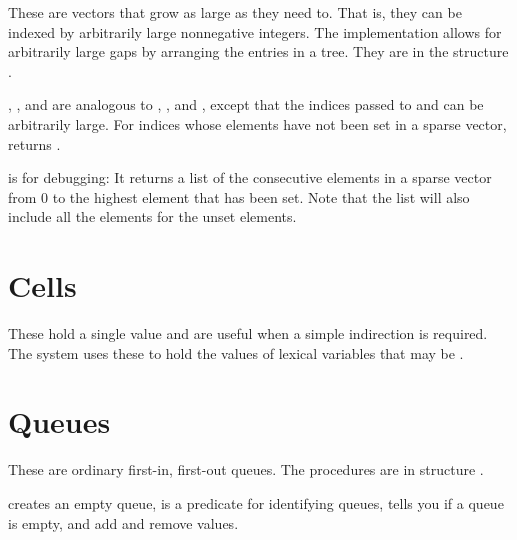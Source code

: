 These are vectors that grow as large as they need to.  That is, they
can be indexed by arbitrarily large nonnegative integers.  The
implementation allows for arbitrarily large gaps by arranging the
entries in a tree.  They are in the structure .

\begin{protos}
\end{protos}
%
, , and
 are analogous to ,
, and , except that the indices
passed to  and  can
be arbitrarily large.  For indices whose elements have not been set in
a sparse vector,  returns .

 is for debugging: It returns a list of the
consecutive elements in a sparse vector from 0 to the highest element
that has been set.  Note that the list will also include all the
 elements for the unset elements.


\section{Cells}
\label{cells}

These hold a single value and are useful when a simple indirection is
 required.
The system uses these to hold the values of lexical variables that
 may be .

\begin{protos}
\end{protos}

\section{Queues}

These are ordinary first-in, first-out queues.
The procedures are in structure .

\begin{protos}
\end{protos}
\noindent 
{} creates an empty queue,  is a predicate for
 identifying queues,  tells you if a queue is empty,
  and  add and remove values.

